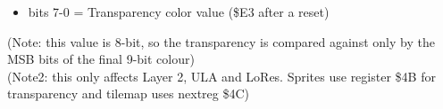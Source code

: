 \begin{itemize}
\item bits 7-0 = Transparency color value (\$E3 after a reset)
\end{itemize}
(Note: this value is 8-bit, so the transparency is compared against
only by the MSB bits of the final 9-bit colour)\\
(Note2: this only affects Layer 2, ULA and LoRes. Sprites use register
\$4B for transparency and tilemap uses nextreg \$4C)

